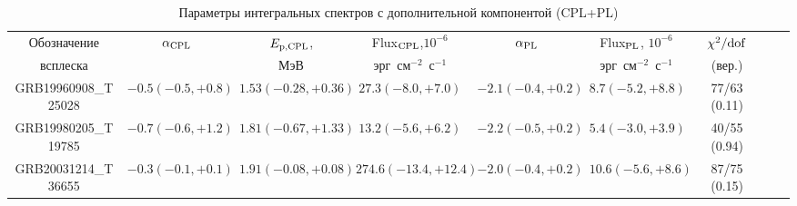 {\renewcommand\tabcolsep{3pt}
\begin{table} [h]
 \centering
  \caption{Параметры интегральных спектров с дополнительной компонентой (CPL+PL)}
  \label{tab:extra_comp}
  \scriptsize
  \begin{center}
  \begin{tabular}{ccccccccc}
  \hline
  \hline
  Обозначение & $\alpha_{\mathrm{CPL}}$ & $E_{\mathrm{p,CPL}}$, & Flux$_{\mathrm{CPL}}$,$10^{-6}$ & $\alpha_{\mathrm{PL}}$ & 
      Flux$_{\mathrm{PL}}$, $10^{-6}$ & $\chi^2/{\mathrm{dof}}$ \\
  всплеска &   & МэВ & эрг~см$^{-2}$~с$^{-1}$ &  & эрг~см$^{-2}$~с$^{-1}$ & (вер.) \\
  \hline  
GRB19960908\_T25028 & $-0.5(-0.5,+0.8)$ & $1.53(-0.28,+0.36)$ & $27.3(-8.0,+7.0)$   & $-2.1(-0.4,+0.2)$ & $8.7(-5.2,+8.8)$  & 77/63 (0.11) \\
GRB19980205\_T19785 & $-0.7(-0.6,+1.2)$ & $1.81(-0.67,+1.33)$ & $13.2(-5.6,+6.2)$   & $-2.2(-0.5,+0.2)$ & $5.4(-3.0,+3.9)$  & 40/55 (0.94) \\
GRB20031214\_T36655 & $-0.3(-0.1,+0.1)$ & $1.91(-0.08,+0.08)$ & $274.6(-13.4,+12.4)$& $-2.0(-0.4,+0.2)$ & $10.6(-5.6,+8.6)$ & 87/75 (0.15) \\
\hline
\end{tabular}
\end{center}
\end{table}
}